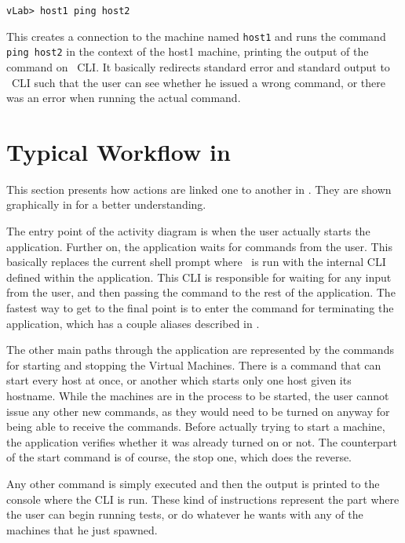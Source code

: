 \lstset{label=lst:ping-example}
\begin{lstlisting}
vLab> host1 ping host2
\end{lstlisting}

This creates a connection to the machine named \texttt{host1} and runs the command \texttt{ping host2} in the context of the host1 machine, printing the output of the command on \project\ CLI.
It basically redirects standard error and standard output to \project\ CLI such that the user can see whether he issued a wrong command, or there was an error when running the actual command.

\section{Typical Workflow in \project}
\label{sec:typical-workflow}

This section presents how actions are linked one to another in \project.
They are shown graphically in  for a better understanding.


The entry point of the activity diagram is when the user actually starts the application.
Further on, the application waits for commands from the user.
This basically replaces the current shell prompt where \project\ is run with the internal CLI defined within the application.
This CLI is responsible for waiting for any input from the user, and then passing the command to the rest of the application.
The fastest way to get to the final point is to enter the command for terminating the application, which has a couple aliases described in .

The other main paths through the application are represented by the commands for starting and stopping the Virtual Machines.
There is a command that can start every host at once, or another which starts only one host given its hostname.
While the machines are in the process to be started, the user cannot issue any other new commands, as they would need to be turned on anyway for being able to receive the commands.
Before actually trying to start a machine, the application verifies whether it was already turned on or not.
The counterpart of the start command is of course, the stop one, which does the reverse.

Any other command is simply executed and then the output is printed to the console where the CLI is run.
These kind of instructions represent the part where the user can begin running tests, or do whatever he wants with any of the machines that he just spawned.

